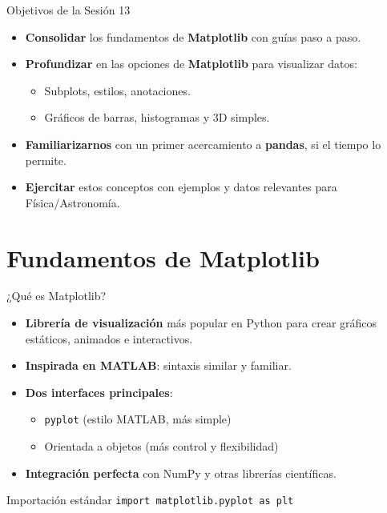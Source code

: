 \documentclass[10pt]{beamer}
\begin{document}
\begin{frame}{Objetivos de la Sesión 13}
  \begin{itemize}
    \item \textbf{Consolidar} los fundamentos de \textbf{Matplotlib} con guías paso a paso.
    \item \textbf{Profundizar} en las opciones de \textbf{Matplotlib} para visualizar datos:
      \begin{itemize}
        \item Subplots, estilos, anotaciones.
        \item Gráficos de barras, histogramas y 3D simples.
      \end{itemize}
    \item \textbf{Familiarizarnos} con un primer acercamiento a \textbf{pandas}, si el tiempo lo permite.
    \item \textbf{Ejercitar} estos conceptos con ejemplos y datos relevantes para Física/Astronomía.
  \end{itemize}
\end{frame}


\section{Fundamentos de Matplotlib}

\begin{frame}{¿Qué es Matplotlib?}
  \begin{itemize}
    \item \textbf{Librería de visualización} más popular en Python para crear gráficos estáticos, animados e interactivos.
    \item \textbf{Inspirada en MATLAB}: sintaxis similar y familiar.
    \item \textbf{Dos interfaces principales}:
      \begin{itemize}
        \item \texttt{pyplot} (estilo MATLAB, más simple)
        \item Orientada a objetos (más control y flexibilidad)
      \end{itemize}
    \item \textbf{Integración perfecta} con NumPy y otras librerías científicas.
  \end{itemize}
  
  \begin{alertblock}{Importación estándar}
    \texttt{import matplotlib.pyplot as plt}
  \end{alertblock}
\end{frame}
\end{document}
